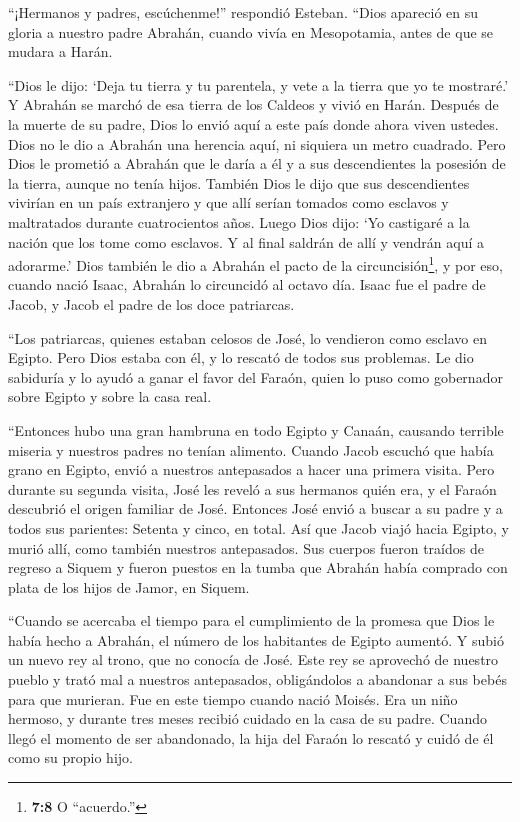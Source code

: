  ``¡Hermanos y padres, escúchenme!'' respondió Esteban.
``Dios apareció en su gloria a nuestro padre Abrahán, cuando vivía en
Mesopotamia, antes de que se mudara a Harán.

 ``Dios le dijo: `Deja tu tierra y tu parentela, y vete a la
tierra que yo te mostraré.'  Y Abrahán se marchó de esa
tierra de los Caldeos y vivió en Harán. Después de la muerte de su
padre, Dios lo envió aquí a este país donde ahora viven ustedes.
 Dios no le dio a Abrahán una herencia aquí, ni siquiera un
metro cuadrado. Pero Dios le prometió a Abrahán que le daría a él y a
sus descendientes la posesión de la tierra, aunque no tenía hijos.
 También Dios le dijo que sus descendientes vivirían en un
país extranjero y que allí serían tomados como esclavos y maltratados
durante cuatrocientos años.  Luego Dios dijo: `Yo castigaré
a la nación que los tome como esclavos. Y al final saldrán de allí y
vendrán aquí a adorarme.'  Dios también le dio a Abrahán el
pacto de la circuncisión\footnote{\textbf{7:8} O ``acuerdo.''}, y por
eso, cuando nació Isaac, Abrahán lo circuncidó al octavo día. Isaac fue
el padre de Jacob, y Jacob el padre de los doce patriarcas.

 ``Los patriarcas, quienes estaban celosos de José, lo
vendieron como esclavo en Egipto. Pero Dios estaba con él, 
y lo rescató de todos sus problemas. Le dio sabiduría y lo ayudó a ganar
el favor del Faraón, quien lo puso como gobernador sobre Egipto y sobre
la casa real.

 ``Entonces hubo una gran hambruna en todo Egipto y Canaán,
causando terrible miseria y nuestros padres no tenían alimento.
 Cuando Jacob escuchó que había grano en Egipto, envió a
nuestros antepasados a hacer una primera visita.  Pero
durante su segunda visita, José les reveló a sus hermanos quién era, y
el Faraón descubrió el origen familiar de José.  Entonces
José envió a buscar a su padre y a todos sus parientes: Setenta y cinco,
en total.  Así que Jacob viajó hacia Egipto, y murió allí,
como también nuestros antepasados.  Sus cuerpos fueron
traídos de regreso a Siquem y fueron puestos en la tumba que Abrahán
había comprado con plata de los hijos de Jamor, en Siquem.

 ``Cuando se acercaba el tiempo para el cumplimiento de la
promesa que Dios le había hecho a Abrahán, el número de los habitantes
de Egipto aumentó.  Y subió un nuevo rey al trono, que no
conocía de José.  Este rey se aprovechó de nuestro pueblo y
trató mal a nuestros antepasados, obligándolos a abandonar a sus bebés
para que murieran.  Fue en este tiempo cuando nació Moisés.
Era un niño hermoso, y durante tres meses recibió cuidado en la casa de
su padre.  Cuando llegó el momento de ser abandonado, la
hija del Faraón lo rescató y cuidó de él como su propio hijo.

